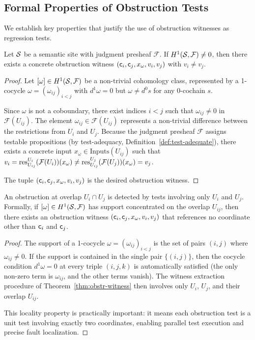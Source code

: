 \documentclass[11pt]{article}
\begin{document}
\subsection{Formal Properties of Obstruction Tests}

We establish key properties that justify the use of obstruction witnesses
as regression tests.

\begin{theorem}\label{thm:obstr-witness}
Let $\mathcal{S}$ be a semantic site with judgment presheaf $\mathcal{F}$.  If
$H^{1}(\mathcal{S}, \mathcal{F}) \neq 0$, then there exists a concrete
obstruction witness $(\mathsf{c}_i, \mathsf{c}_j, x_\omega, v_i, v_j)$ with
$v_i \neq v_j$.
\end{theorem}

\begin{proof}
Let $[\omega] \in H^{1}(\mathcal{S}, \mathcal{F})$ be a non-trivial cohomology
class, represented by a 1-cocycle $\omega = (\omega_{ij})_{i<j}$ with
$d^1 \omega = 0$ but $\omega \neq d^0 s$ for any 0-cochain $s$.

Since $\omega$ is not a coboundary, there exist indices $i < j$ such that
$\omega_{ij} \neq 0$ in $\mathcal{F}(U_{ij})$.  The element
$\omega_{ij} \in \mathcal{F}(U_{ij})$ represents a non-trivial difference
between the restrictions from $U_i$ and $U_j$.  Because the judgment
presheaf $\mathcal{F}$ assigns testable propositions (by test-adequacy,
Definition~\ref{def:test-adequate}), there exists a concrete input
$x_\omega \in \mathrm{Inputs}(U_{ij})$ such that
$v_i = \mathrm{res}_{U_{ij}}^{U_i}(\mathcal{F}(U_i))(x_\omega) \neq
\mathrm{res}_{U_{ij}}^{U_j}(\mathcal{F}(U_j))(x_\omega) = v_j$.

The tuple $(\mathsf{c}_i, \mathsf{c}_j, x_\omega, v_i, v_j)$ is the desired
obstruction witness.
\end{proof}

\begin{proposition}\label{prop:obstr-locality}
An obstruction at overlap $U_i \cap U_j$ is detected by tests involving
only $U_i$ and $U_j$.  Formally, if $[\omega] \in H^{1}(\mathcal{S},
\mathcal{F})$ has support concentrated on the overlap $U_{ij}$, then
there exists an obstruction witness $(\mathsf{c}_i, \mathsf{c}_j, x_\omega,
v_i, v_j)$ that references no coordinate other than $\mathsf{c}_i$ and
$\mathsf{c}_j$.
\end{proposition}

\begin{proof}
The support of a 1-cocycle $\omega = (\omega_{ij})_{i<j}$ is the set of
pairs $(i,j)$ where $\omega_{ij} \neq 0$.  If the support is contained
in the single pair $\{(i,j)\}$, then the cocycle condition
$d^1\omega = 0$ at every triple $(i,j,k)$ is automatically satisfied
(the only non-zero term is $\omega_{ij}$, and the other terms vanish).
The witness extraction procedure of Theorem~\ref{thm:obstr-witness}
then involves only $U_i$, $U_j$, and their overlap $U_{ij}$.

This locality property is practically important: it means each obstruction
test is a unit test involving exactly two coordinates, enabling parallel
test execution and precise fault localization.
\end{proof}
\end{document}
